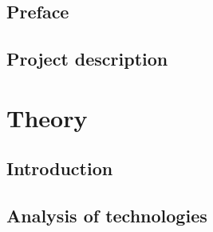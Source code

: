 
\raggedbottom



\frontmatter
 

\cleardoublepage

\cleardoublepage

\chapter*{Preface}


\cleardoublepage

{}
\tableofcontents*

\mainmatter
  

\chapter{Project description}


\part{Theory}
\chapter{Introduction}


\chapter{Analysis of technologies}


\begingroup
 \raggedright
 
\endgroup

\appendix
\clearforchapter


